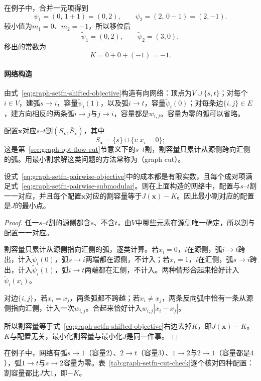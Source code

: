 在例子中，合并一元项得到
\[
  \psi_1=(0,\,1+1)=(0,2),\qquad \psi_2=(2,\,0-1)=(2,-1).
\]
较小值为$m_1=0$、$m_2=-1$，所以移位后
\[
  \tilde\psi_1=(0,2),\qquad \tilde\psi_2=(3,0),
\]
移出的常数为
\[
  K=0+0+(-1)=-1.
\]

\paragraph{网络构造}
由式~\eqref{eq:graph-setfn-shifted-objective}构造有向网络：顶点为$V\cup\{s,t\}$；对每个$i\in V$，建弧$s\to i$，容量$\tilde\psi_i(1)$，以及弧$i\to t$，容量$\tilde\psi_i(0)$；对每条边$\{i,j\}\in E$，建方向相反的两条弧$i\to j$与$j\to i$，容量都是$w_{i,j}$。容量为零的弧可以省略。

配置$\bm x$对应$s$--$t$割$(S_{\bm x},\bar S_{\bm x})$，其中
\[
  S_{\bm x}=\{s\}\cup\{i:x_i=0\};
\]
这是第~\ref{sec:graph-opt-flow-cut}节意义下的$s$--$t$割，割容量只累计从源侧跨向汇侧的弧。用最小割求解这类问题的方法常称为（graph cut）。

\begin{theorem}[成对二值函数的割表示]
\label{thm:graph-setfn-cut-representation}
设式~\eqref{eq:graph-setfn-pairwise-objective}中的成本都是有限实数，且每个成对项满足式~\eqref{eq:graph-setfn-pairwise-submodular}。则在上面构造的网络中，配置与$s$--$t$割一一对应，并且每个配置$\bm x$对应的割容量等于$J(\bm x)-K$。因此最小割对应的配置是$J$的最小点。
\end{theorem}

\begin{proof}
任一$s$--$t$割的源侧都含$s$、不含$t$，由$V$中哪些元素在源侧唯一确定，所以割与配置一一对应。

割容量只累计从源侧指向汇侧的弧，逐类计算。若$x_i=0$，$i$在源侧，弧$i\to t$跨出，计入$\tilde\psi_i(0)$，弧$s\to i$两端都在源侧，不计入；若$x_i=1$，$i$在汇侧，弧$s\to i$跨出，计入$\tilde\psi_i(1)$，弧$i\to t$两端都在汇侧，不计入。两种情形合起来恰好计入$\tilde\psi_i(x_i)$。

对边$\{i,j\}$，若$x_i=x_j$，两条弧都不跨越；若$x_i\neq x_j$，两条反向弧中恰有一条从源侧指向汇侧，计入一次$w_{i,j}$。合起来恰好计入$w_{i,j}|x_i-x_j|$。

所以割容量等于式~\eqref{eq:graph-setfn-shifted-objective}右边去掉$K$，即$J(\bm x)-K$。$K$与配置无关，最小化割容量与最小化$J$是同一件事。
\end{proof}

在例子中，网络有弧$s\to1$（容量$2$）、$2\to t$（容量$3$）、$1\to2$与$2\to1$（容量都是$4$），弧$1\to t$与$s\to2$容量为零。表~\ref{tab:graph-setfn-cut-check}逐个核对四种配置：割容量都比$J$大$1$，即$-K$。


